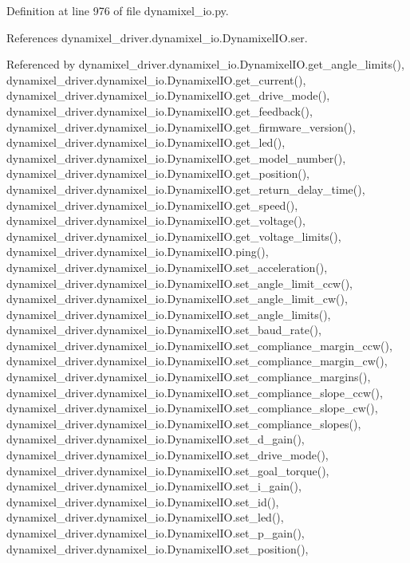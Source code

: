 Definition at line 976 of file dynamixel\+\_\+io.\+py.



References dynamixel\+\_\+driver.\+dynamixel\+\_\+io.\+Dynamixel\+I\+O.\+ser.



Referenced by dynamixel\+\_\+driver.\+dynamixel\+\_\+io.\+Dynamixel\+I\+O.\+get\+\_\+angle\+\_\+limits(), dynamixel\+\_\+driver.\+dynamixel\+\_\+io.\+Dynamixel\+I\+O.\+get\+\_\+current(), dynamixel\+\_\+driver.\+dynamixel\+\_\+io.\+Dynamixel\+I\+O.\+get\+\_\+drive\+\_\+mode(), dynamixel\+\_\+driver.\+dynamixel\+\_\+io.\+Dynamixel\+I\+O.\+get\+\_\+feedback(), dynamixel\+\_\+driver.\+dynamixel\+\_\+io.\+Dynamixel\+I\+O.\+get\+\_\+firmware\+\_\+version(), dynamixel\+\_\+driver.\+dynamixel\+\_\+io.\+Dynamixel\+I\+O.\+get\+\_\+led(), dynamixel\+\_\+driver.\+dynamixel\+\_\+io.\+Dynamixel\+I\+O.\+get\+\_\+model\+\_\+number(), dynamixel\+\_\+driver.\+dynamixel\+\_\+io.\+Dynamixel\+I\+O.\+get\+\_\+position(), dynamixel\+\_\+driver.\+dynamixel\+\_\+io.\+Dynamixel\+I\+O.\+get\+\_\+return\+\_\+delay\+\_\+time(), dynamixel\+\_\+driver.\+dynamixel\+\_\+io.\+Dynamixel\+I\+O.\+get\+\_\+speed(), dynamixel\+\_\+driver.\+dynamixel\+\_\+io.\+Dynamixel\+I\+O.\+get\+\_\+voltage(), dynamixel\+\_\+driver.\+dynamixel\+\_\+io.\+Dynamixel\+I\+O.\+get\+\_\+voltage\+\_\+limits(), dynamixel\+\_\+driver.\+dynamixel\+\_\+io.\+Dynamixel\+I\+O.\+ping(), dynamixel\+\_\+driver.\+dynamixel\+\_\+io.\+Dynamixel\+I\+O.\+set\+\_\+acceleration(), dynamixel\+\_\+driver.\+dynamixel\+\_\+io.\+Dynamixel\+I\+O.\+set\+\_\+angle\+\_\+limit\+\_\+ccw(), dynamixel\+\_\+driver.\+dynamixel\+\_\+io.\+Dynamixel\+I\+O.\+set\+\_\+angle\+\_\+limit\+\_\+cw(), dynamixel\+\_\+driver.\+dynamixel\+\_\+io.\+Dynamixel\+I\+O.\+set\+\_\+angle\+\_\+limits(), dynamixel\+\_\+driver.\+dynamixel\+\_\+io.\+Dynamixel\+I\+O.\+set\+\_\+baud\+\_\+rate(), dynamixel\+\_\+driver.\+dynamixel\+\_\+io.\+Dynamixel\+I\+O.\+set\+\_\+compliance\+\_\+margin\+\_\+ccw(), dynamixel\+\_\+driver.\+dynamixel\+\_\+io.\+Dynamixel\+I\+O.\+set\+\_\+compliance\+\_\+margin\+\_\+cw(), dynamixel\+\_\+driver.\+dynamixel\+\_\+io.\+Dynamixel\+I\+O.\+set\+\_\+compliance\+\_\+margins(), dynamixel\+\_\+driver.\+dynamixel\+\_\+io.\+Dynamixel\+I\+O.\+set\+\_\+compliance\+\_\+slope\+\_\+ccw(), dynamixel\+\_\+driver.\+dynamixel\+\_\+io.\+Dynamixel\+I\+O.\+set\+\_\+compliance\+\_\+slope\+\_\+cw(), dynamixel\+\_\+driver.\+dynamixel\+\_\+io.\+Dynamixel\+I\+O.\+set\+\_\+compliance\+\_\+slopes(), dynamixel\+\_\+driver.\+dynamixel\+\_\+io.\+Dynamixel\+I\+O.\+set\+\_\+d\+\_\+gain(), dynamixel\+\_\+driver.\+dynamixel\+\_\+io.\+Dynamixel\+I\+O.\+set\+\_\+drive\+\_\+mode(), dynamixel\+\_\+driver.\+dynamixel\+\_\+io.\+Dynamixel\+I\+O.\+set\+\_\+goal\+\_\+torque(), dynamixel\+\_\+driver.\+dynamixel\+\_\+io.\+Dynamixel\+I\+O.\+set\+\_\+i\+\_\+gain(), dynamixel\+\_\+driver.\+dynamixel\+\_\+io.\+Dynamixel\+I\+O.\+set\+\_\+id(), dynamixel\+\_\+driver.\+dynamixel\+\_\+io.\+Dynamixel\+I\+O.\+set\+\_\+led(), dynamixel\+\_\+driver.\+dynamixel\+\_\+io.\+Dynamixel\+I\+O.\+set\+\_\+p\+\_\+gain(), dynamixel\+\_\+driver.\+dynamixel\+\_\+io.\+Dynamixel\+I\+O.\+set\+\_\+position(), 